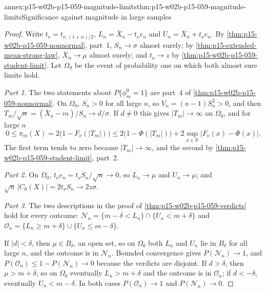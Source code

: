 \begin{annexitem}{annex:p15-w02b-p15-059-magnitude-limits}{thm:p15-w02b-p15-059-magnitude-limits}{Significance against magnitude in large samples}
\begin{proof}
Write \(t_\nu=t_{\nu,(1+\alpha)/2}\), \(L_n=\bar X_n-t_\nu e_n\) and
\(U_n=\bar X_n+t_\nu e_n\). By
\cref{thm:p15-w02b-p15-059-nonnormal}, part~1, \(S_n\to\sigma\) almost
surely; by \cref{thm:p15-extended-mean-strong-law}, \(\bar X_n\to\mu\)
almost surely; and \(t_\nu\to z\) by
\cref{thm:p15-w02b-p15-059-student-limit}. Let \(\Omega_0\) be the event of
probability one on which both almost sure limits hold.

\emph{Part 1.} The two statements about \(P\{\phi_m^0=1\}\) are part~4 of
\cref{thm:p15-w02b-p15-059-nonnormal}. On \(\Omega_0\),
\(S_n>0\) for all large \(n\), so \(V_n=(n-1)S_n^2>0\), and then
\(T_m/\sqrt n=(\bar X_n-m)/S_n\to d/\sigma\). If \(d\neq0\) this gives
\(|T_m|\to\infty\) on \(\Omega_0\), and for large \(n\)
\[
 0\leq\pi_m(X)=2\bigl(1-F_\nu(|T_m|)\bigr)
 \leq2\bigl(1-\Phi(|T_m|)\bigr)+2\sup_{x\in\mathbb R}|F_\nu(x)-\Phi(x)| .
\]
The first term tends to zero because \(|T_m|\to\infty\), and the second by
\cref{thm:p15-w02b-p15-059-student-limit}, part~2.

\emph{Part 2.} On \(\Omega_0\), \(t_\nu e_n=t_\nu S_n/\sqrt n\to0\), so
\(L_n\to\mu\) and \(U_n\to\mu\); and
\(\sqrt n\,|C_0(X)|=2t_\nu S_n\to2z\sigma\).

\emph{Part 3.} The two descriptions in the proof of
\cref{thm:p15-w02b-p15-059-verdicts} hold for every outcome:
\(\mathcal N_n=\{m-\delta<L_n\}\cap\{U_n<m+\delta\}\) and
\(\mathcal O_n=\{L_n\geq m+\delta\}\cup\{U_n\leq m-\delta\}\).

If \(|d|<\delta\), then \(\mu\in B_\delta\), an open set, so on
\(\Omega_0\) both \(L_n\) and \(U_n\) lie in \(B_\delta\) for all large
\(n\), and the outcome is in \(\mathcal N_n\). Bounded convergence gives
\(P(\mathcal N_n)\to1\), and \(P(\mathcal O_n)\leq1-P(\mathcal N_n)\to0\)
because the verdicts are disjoint. If \(d>\delta\), then
\(\mu>m+\delta\), so on \(\Omega_0\) eventually \(L_n>m+\delta\) and the
outcome is in \(\mathcal O_n\); if \(d<-\delta\), eventually
\(U_n<m-\delta\). In both cases \(P(\mathcal O_n)\to1\) and
\(P(\mathcal N_n)\to0\).


\end{proof}
\end{annexitem}
